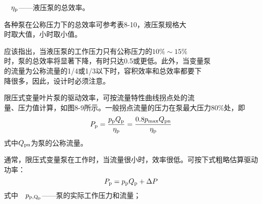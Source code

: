$\quad \eta _{\rm p}$——液压泵的总效率。

各种泵在公称压力下的总效率可参考表8-10，液压泵规格大\\时取大值，小时取小值。

应该指出，当液压泵的工作压力只有公称压力的$10\%\sim 15\%$\\时，泵的总效率将显著下降，有时只达0.5或更低。此外，当变量泵\\的流量为公称流量的1/4或1/3以下时，容积效率和总效率都要下\\降很多，因此，设计时必须注意。

限压式变量叶片泵的驱动效率，可按流量特性曲线拐点处的流\\量、压力值计算，如图8-9所示。一般拐点流量的压力在泵最大压力$80\%$处，即
\begin{equation}
    P_{\rm p}=\frac{p_{\rm p}Q_{\rm p}}{\eta_{\rm p}}=\frac{0.8p_{\rm max}Q_{\rm pn}}{\eta_{\rm p}}
\end{equation}
式中$Q_{\rm pn}$为泵的公称流量。

通常，限压式变量泵在工作时，当流量很小时，效率很低。可按下式粗略估算驱动功率：
\begin{equation}
    P_{\rm p}=p_{\rm p}Q_{\rm p}+\Delta P
\end{equation}
式中$\quad p_{\rm p,Q_{\rm p}}$——泵的实际工作压力和流量；



